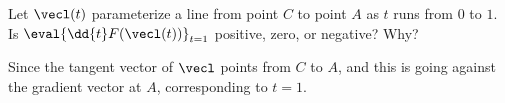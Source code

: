 \documentclass{ximera}
\begin{document}

\begin{problem}
  Let $\vecl(t)$ parameterize a line from point $C$ to point $A$ as $t$
  runs from $0$ to $1$. Is $\eval{\dd{t} F(\vecl(t))}_{t=1}$ positive, zero, or
  negative? Why?
  \begin{prompt}
    \begin{multipleChoice}
    \end{multipleChoice}
    \begin{feedback}
      Since the tangent vector of $\vecl$ points from $C$ to $A$, and
      this is going against the gradient vector at $A$, corresponding
      to $t=1$.
    \end{feedback}
  \end{prompt}

  \vfill
  
\end{problem}
\end{document}
